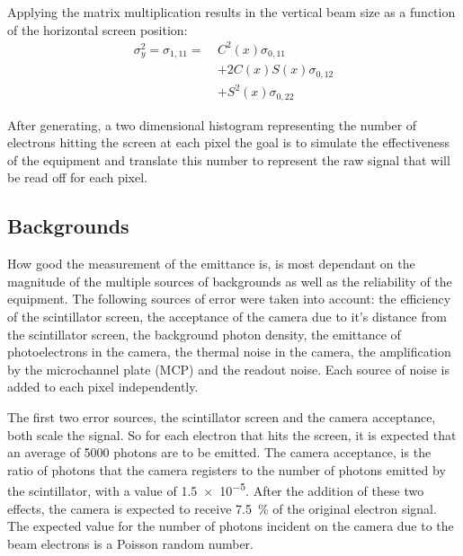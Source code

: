 
Applying the matrix multiplication results in the vertical beam size as a
function of the horizontal screen position:
\begin{equation}
	\begin{split}
		\sigma_y^2 = \sigma_{1,11} =\: & C^2(x)\sigma_{0,11} \\
									&+ 2C(x)S(x)\sigma_{0,12} \\
									&+ S^2(x)\sigma_{0,22}
	\end{split}
\end{equation}

After generating, a two dimensional histogram representing the number of
electrons hitting the screen at each pixel the goal is to simulate the
effectiveness of the equipment and translate this number to represent the raw
signal that will be read off for each pixel.

\subsection{Backgrounds}

How good the measurement of the emittance is, is most dependant on the magnitude
of the multiple sources of backgrounds as well as the reliability of the
equipment. The following sources of error were taken into account: the
efficiency of the scintillator screen, the acceptance of the camera due to it's
distance from the scintillator screen, the background photon density, the
emittance of photoelectrons in the camera, the thermal noise in the camera, the
amplification by the microchannel plate (MCP) and the readout noise.  Each
source of noise is added to each pixel independently.


The first two error sources, the scintillator screen and the camera acceptance,
both scale the signal. So for each electron that hits the screen, it is
expected that an average of \num{5000} photons are to be emitted. The
camera acceptance, is the ratio of photons that the camera registers to the
number of photons emitted by the scintillator, with a value of \num{1.5e-5}.
After the addition of these two effects, the camera is expected to receive
\SI{7.5}{\percent} of the original electron signal. The expected value for the
number of photons incident on the camera due to the beam electrons is a Poisson
random number.

